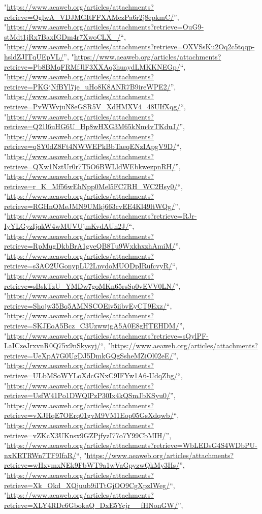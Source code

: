 \documentclass[]{article}
\begin{document}
\begin{itemize}
  "\url{https://www.aeaweb.org/articles/attachments?retrieve=OglwA_VDJMGItFFXAMezPa6r2j8epkmC/}'',
  "\url{https://www.aeaweb.org/articles/attachments?retrieve=OuG9-stMdt1jRx7BaxIGDm4r7XwoCLX_/}``,
  "\url{https://www.aeaweb.org/articles/attachments?retrieve=OXVSsKu2Oq2c5tqqp-hsldZJITqUEpVL/}'',
  "\url{https://www.aeaweb.org/articles/attachments?retrieve=Pb8BMqFRMfJlF3XXAq3huaydLMKKNEGp/}``,
  "\url{https://www.aeaweb.org/articles/attachments?retrieve=PKGjNfBYl7je_uHo8K8ANR7B9ireWPE2/}'',
  "\url{https://www.aeaweb.org/articles/attachments?retrieve=PvWWvjuN8eGSR5V_XdHMXV4_48UIfXqg/}``,
  "\url{https://www.aeaweb.org/articles/attachments?retrieve=Q21l6uHG6U_Hp8wHXG3M65kNm4vTKduJ/}'',
  "\url{https://www.aeaweb.org/articles/attachments?retrieve=qSY0dZ8Ft4NWWEPkBbTaeqENzIApgV9D/}``,
  "\url{https://www.aeaweb.org/articles/attachments?retrieve=QXw1NztUr0r7T5O6BWLldWEbkwezpnRH/}'',
  "\url{https://www.aeaweb.org/articles/attachments?retrieve=r_K_Mf56wEhNpp0Mel5FC7RH_WC2Hsy0/}``,
  "\url{https://www.aeaweb.org/articles/attachments?retrieve=RGHnQMeJMN9UMkj663cvEE4Kl49ltWQg/}'',
  "\url{https://www.aeaweb.org/articles/attachments?retrieve=RJr-IyYLGyzIjqkW4wMUVUjmKvdAUn2J/}``,
  "\url{https://www.aeaweb.org/articles/attachments?retrieve=RpMugDkbBrA1gveQB8Tu9WxkhxzhAmiM/}'',
  "\url{https://www.aeaweb.org/articles/attachments?retrieve=s3AO2UGonypLU2LnydoMUODpIRufcvyR/}``,
  "\url{https://www.aeaweb.org/articles/attachments?retrieve=sBskTzU_YMDw7goMKn65rsSp0vEVV0LN/}'',
  "\url{https://www.aeaweb.org/articles/attachments?retrieve=Shojw35Bq5AMNSCOEiv5iibvEyCT9Exz/}``,
  "\url{https://www.aeaweb.org/articles/attachments?retrieve=SKJEoA5Bcz_C3UzwwjgA5A0E8gHTEHDM/}'',
  "\url{https://www.aeaweb.org/articles/attachments?retrieve=sQylPF-LaICzeJrxvnR0Q75x9nSkysyj/}``,
  "\url{https://www.aeaweb.org/articles/attachments?retrieve=UeXpA7G0UgDJ5DmkGQgSsheMZiOl02eE/}'',
  "\url{https://www.aeaweb.org/articles/attachments?retrieve=ULbMSoWYLoXdcGNxC9IFYw1A6-UdqZbg/}``,
  "\url{https://www.aeaweb.org/articles/attachments?retrieve=UsfW41Po1DWQlPzP30Ix4kQSmJbKSyu0/}'',
  "\url{https://www.aeaweb.org/articles/attachments?retrieve=vXJHqE7OErq01gvM9VM1Eop05GsXdqwb/}``,
  "\url{https://www.aeaweb.org/articles/attachments?retrieve=vZKcX3UKnsx9GZPjfyzI77o7Y99CbMIH/}'',
  "\url{https://www.aeaweb.org/articles/attachments?retrieve=WbLEDsG4S4WDbPU-nxKRTRWn7TF9IfaR/}``,
  "\url{https://www.aeaweb.org/articles/attachments?retrieve=wHxvmxNEk9FbWT9a1wVaGpyzwQkMy3Hs/}'',
  "\url{https://www.aeaweb.org/articles/attachments?retrieve=Xk_Okd_XQjuub9iITtGjOO9CgXpzIWeg/}``,
  "\url{https://www.aeaweb.org/articles/attachments?retrieve=XLY4RDc6GbokaQ_DxE5Ycjr__fHNonGW/}'',

\end{itemize}
\end{document}
